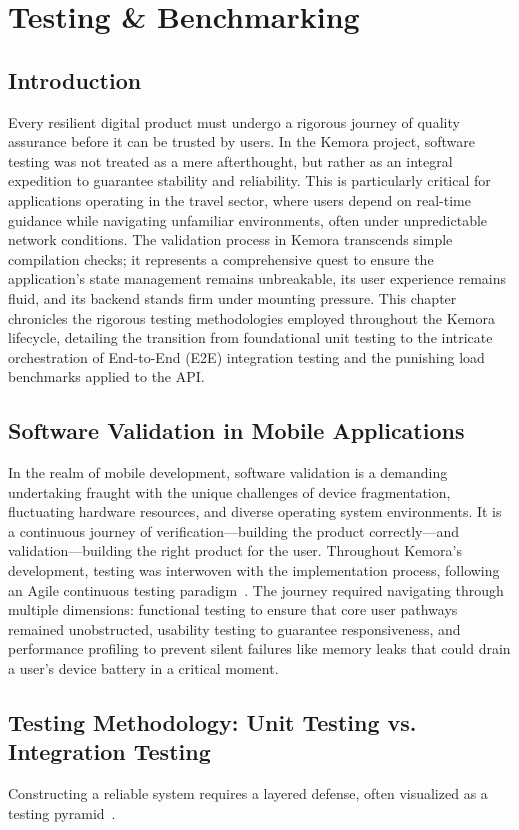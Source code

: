 \chapter{Testing \& Benchmarking}

\section{Introduction}
Every resilient digital product must undergo a rigorous journey of quality assurance before it can be trusted by users. In the Kemora project, software testing was not treated as a mere afterthought, but rather as an integral expedition to guarantee stability and reliability. This is particularly critical for applications operating in the travel sector, where users depend on real-time guidance while navigating unfamiliar environments, often under unpredictable network conditions. The validation process in Kemora transcends simple compilation checks; it represents a comprehensive quest to ensure the application's state management remains unbreakable, its user experience remains fluid, and its backend stands firm under mounting pressure. This chapter chronicles the rigorous testing methodologies employed throughout the Kemora lifecycle, detailing the transition from foundational unit testing to the intricate orchestration of End-to-End (E2E) integration testing and the punishing load benchmarks applied to the API.

\section{Software Validation in Mobile Applications}
In the realm of mobile development, software validation is a demanding undertaking fraught with the unique challenges of device fragmentation, fluctuating hardware resources, and diverse operating system environments. It is a continuous journey of verification---building the product correctly---and validation---building the right product for the user. Throughout Kemora's development, testing was interwoven with the implementation process, following an Agile continuous testing paradigm~\cite{agile_testing}. The journey required navigating through multiple dimensions: functional testing to ensure that core user pathways remained unobstructed, usability testing to guarantee responsiveness, and performance profiling to prevent silent failures like memory leaks that could drain a user's device battery in a critical moment.

\section{Testing Methodology: Unit Testing vs. Integration Testing}
Constructing a reliable system requires a layered defense, often visualized as a testing pyramid~\cite{testing_pyramid}. 

